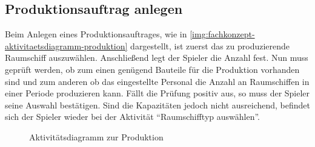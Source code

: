 \subsection{Produktionsauftrag anlegen}
\label{sec:fachkonzept-aktivitaetsdiagramm-produktion}

Beim Anlegen eines Produktionsauftrages, wie in \vref{img:fachkonzept-aktivitaetsdiagramm-produktion} dargestellt, ist zuerst das zu produzierende Raumschiff auszuwählen. Anschließend legt der Spieler die Anzahl fest. Nun muss geprüft werden, ob zum einen genügend Bauteile für die Produktion vorhanden sind und zum anderen ob das eingestellte Personal die Anzahl an Raumschiffen in einer Periode produzieren kann. Fällt die Prüfung positiv aus, so muss der Spieler seine Auswahl bestätigen. Sind die Kapazitäten jedoch nicht ausreichend, befindet sich der Spieler wieder bei der Aktivität “Raumschifftyp auswählen”.

\begin{figure}[h]
  \centering
  \caption{Aktivitätsdiagramm zur Produktion}
  \label{img:fachkonzept-aktivitaetsdiagramm-produktion}
\end{figure}